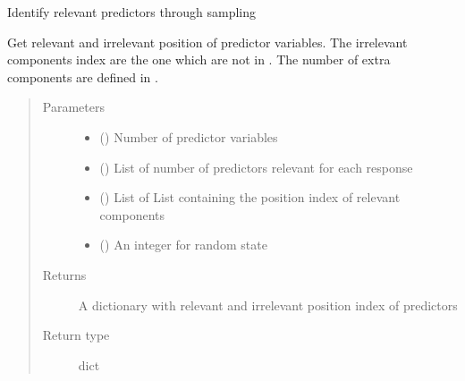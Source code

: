 \documentclass[letterpaper,10pt,english]{sphinxmanual}
\begin{document}
\begin{fulllineitems}
\label{\detokenize{Utilities:pysimrel.utilities.get_relpred}}
Identify relevant predictors through sampling

Get relevant and irrelevant position of predictor variables. The irrelevant
components index are the one which are not in . The number of extra components
are defined in .
\begin{quote}\begin{description}
\item[{Parameters}] \leavevmode\begin{itemize}
\item {} 
 () \textendash{} Number of predictor variables

\item {} 
 () \textendash{} List of number of predictors relevant for each response

\item {} 
 () \textendash{} List of List containing the position index of relevant components

\item {} 
 () \textendash{} An integer for random state

\end{itemize}

\item[{Returns}] \leavevmode
A dictionary with relevant and irrelevant position index of predictors

\item[{Return type}] \leavevmode
dict

\end{description}\end{quote}

\end{fulllineitems}

\end{document}
